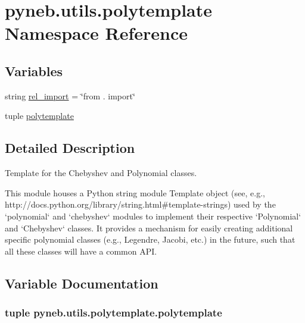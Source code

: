 \hypertarget{namespacepyneb_1_1utils_1_1polytemplate}{\section{pyneb.\-utils.\-polytemplate Namespace Reference}
\label{namespacepyneb_1_1utils_1_1polytemplate}
}
\subsection*{Variables}
\begin{DoxyCompactItemize}
\item 
string \hyperlink{namespacepyneb_1_1utils_1_1polytemplate_af687173fec33101d65eb86ef900d1ae8}{rel\-\_\-import} = \char`\"{}from . import\char`\"{}
\item 
tuple \hyperlink{namespacepyneb_1_1utils_1_1polytemplate_ad80e38c107bba3d56d77ce573d1e6d31}{polytemplate}
\end{DoxyCompactItemize}


\subsection{Detailed Description}
\begin{DoxyVerb}Template for the Chebyshev and Polynomial classes.

This module houses a Python string module Template object (see, e.g.,
http://docs.python.org/library/string.html#template-strings) used by
the `polynomial` and `chebyshev` modules to implement their respective
`Polynomial` and `Chebyshev` classes.  It provides a mechanism for easily
creating additional specific polynomial classes (e.g., Legendre, Jacobi,
etc.) in the future, such that all these classes will have a common API.\end{DoxyVerb}
 

\subsection{Variable Documentation}
\hypertarget{namespacepyneb_1_1utils_1_1polytemplate_ad80e38c107bba3d56d77ce573d1e6d31}{
\subsubsection[{polytemplate}]{\setlength{\rightskip}{0pt plus 5cm}tuple pyneb.\-utils.\-polytemplate.\-polytemplate}}\label{namespacepyneb_1_1utils_1_1polytemplate_ad80e38c107bba3d56d77ce573d1e6d31}


